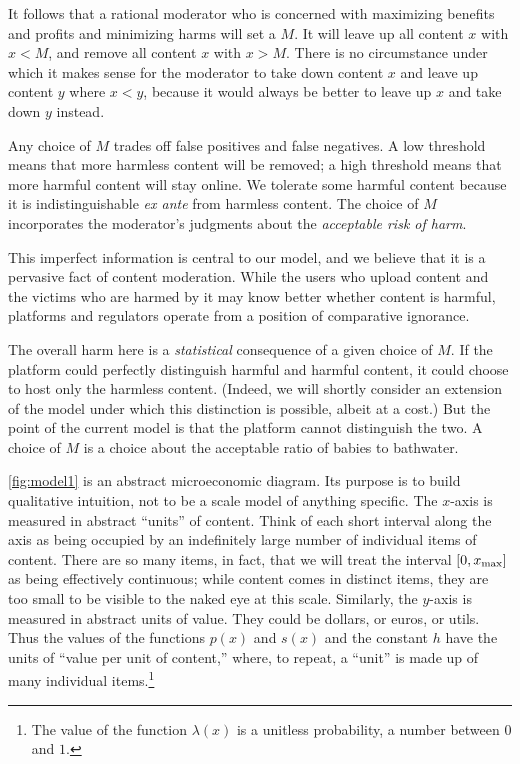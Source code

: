 It follows that a rational moderator who is concerned with maximizing benefits and profits and minimizing harms will set a  $M$. It will leave up all content $x$ with $x < M$, and remove all content $x$ with $x > M$. There is no circumstance under which it makes sense for the moderator to take down content $x$ and leave up content $y$ where $x < y$, because it would always be better to leave up $x$ and take down $y$ instead.

Any choice of $M$ trades off false positives and false negatives. A low threshold means that more harmless content will be removed; a high threshold means that more harmful content will stay online. We tolerate some harmful content because it is indistinguishable \emph{ex ante} from harmless content. The choice of $M$ incorporates the moderator's judgments about the \emph{acceptable risk of harm}.

This imperfect information is central to our model, and we believe that it is a pervasive fact of content moderation. While the users who upload content and the victims who are harmed by it may know better whether content is harmful, platforms and regulators operate from a position of comparative ignorance.

The overall harm here is a \emph{statistical} consequence of a given choice of $M$. If the platform could perfectly distinguish harmful and harmful content, it could choose to host only the harmless content. (Indeed, we will shortly consider an extension of the model under which this distinction is possible, albeit at a cost.) But the point of the current model is that the platform cannot distinguish the two. A choice of $M$ is a choice about the acceptable ratio of babies to bathwater.

\autoref{fig:model1} is an abstract microeconomic diagram. Its purpose is to build qualitative intuition, not to be a scale model of anything specific. The $x$-axis is measured in abstract ``units'' of content. Think of each short interval along the axis as being occupied by an indefinitely large number of individual items of content. There are so many items, in fact, that we will treat the interval $[0,x_{\text{max}}]$ as being effectively continuous; while content comes in distinct items, they are too small to be visible to the naked eye at this scale. Similarly, the $y$-axis is measured in abstract units of value. They could be dollars, or euros, or utils. Thus the values of the functions $p(x)$ and $s(x)$ and the constant $h$ have the units of ``value per unit of content,'' where, to repeat, a ``unit'' is made up of many individual items.\footnote{The value of the function $\lambda(x)$ is a unitless probability, a number between $0$ and $1$.}

